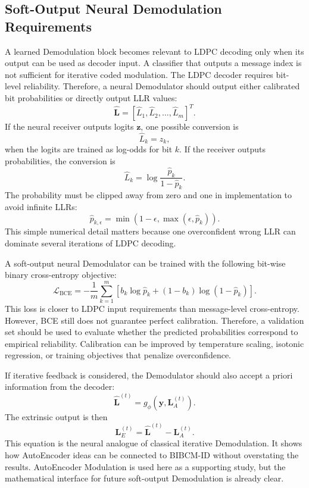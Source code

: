 \subsection{Soft-Output Neural Demodulation Requirements}
A learned Demodulation block becomes relevant to LDPC decoding only when its output can be used as decoder input. A classifier that outputs a message index is not sufficient for iterative coded modulation. The LDPC decoder requires bit-level reliability. Therefore, a neural Demodulator should output either calibrated bit probabilities or directly output LLR values:
\begin{equation}
  \mathbf{\hat{L}}=
  [\hat{L}_1,\hat{L}_2,\ldots,\hat{L}_m]^T.
\end{equation}
If the neural receiver outputs logits $\mathbf{z}$, one possible conversion is
\begin{equation}
  \hat{L}_k=z_k,
\end{equation}
when the logits are trained as log-odds for bit $k$. If the receiver outputs probabilities, the conversion is
\begin{equation}
  \hat{L}_k=\log\frac{\hat{p}_k}{1-\hat{p}_k}.
\end{equation}
The probability must be clipped away from zero and one in implementation to avoid infinite LLRs:
\begin{equation}
  \hat{p}_{k,\epsilon}=\min(1-\epsilon,\max(\epsilon,\hat{p}_k)).
\end{equation}
This simple numerical detail matters because one overconfident wrong LLR can dominate several iterations of LDPC decoding.

A soft-output neural Demodulator can be trained with the following bit-wise binary cross-entropy objective:
\begin{equation}
  \mathcal{L}_{\mathrm{BCE}}=
  -\frac{1}{m}\sum_{k=1}^{m}
  \left[
  b_k\log\hat{p}_k+(1-b_k)\log(1-\hat{p}_k)
  \right].
\end{equation}
This loss is closer to LDPC input requirements than message-level cross-entropy. However, BCE still does not guarantee perfect calibration. Therefore, a validation set should be used to evaluate whether the predicted probabilities correspond to empirical reliability. Calibration can be improved by temperature scaling, isotonic regression, or training objectives that penalize overconfidence.

If iterative feedback is considered, the Demodulator should also accept a priori information from the decoder:
\begin{equation}
  \mathbf{\hat{L}}^{(t)}
  =
  g_\phi(\mathbf{y},\mathbf{L}_A^{(t)}).
\end{equation}
The extrinsic output is then
\begin{equation}
  \mathbf{L}_E^{(t)}=\mathbf{\hat{L}}^{(t)}-\mathbf{L}_A^{(t)}.
\end{equation}
This equation is the neural analogue of classical iterative Demodulation. It shows how AutoEncoder ideas can be connected to BIBCM-ID without overstating the results. AutoEncoder Modulation is used here as a supporting study, but the mathematical interface for future soft-output Demodulation is already clear.

